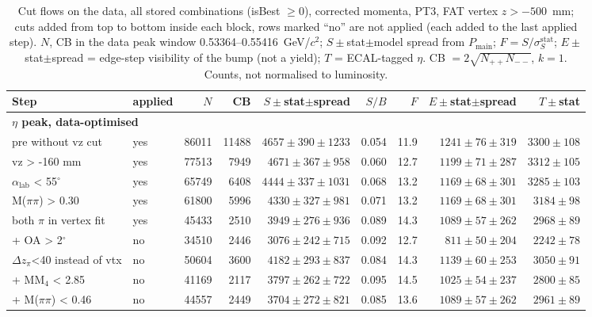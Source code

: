\begin{table}[H]
\centering\footnotesize
\setlength{\tabcolsep}{3pt}
\caption{Cut flows on the data, all stored combinations (isBest $\geq 0$), corrected momenta, PT3, FAT vertex $z>-500$~mm; cuts added from top to bottom inside each block, rows marked ``no'' are not applied (each added to the last applied step). $N$, CB in the data peak window 0.53364--0.55416~GeV/$c^2$; $S\pm$stat$\pm$model spread from $P_\mathrm{main}$; $F=S/\sigma_S^\mathrm{stat}$; $E\pm$stat$\pm$spread = edge-step visibility of the bump (not a yield); $T$ = ECAL-tagged $\eta$. CB $=2\sqrt{N_{++}N_{--}}$, $k=1$. Counts, not normalised to luminosity.}
\label{tab:opt_cutflow}
\begin{tabular}{llrrrrrrr}
\toprule
Step & applied & $N$ & CB & $S\pm$stat$\pm$spread & $S/B$ & $F$ & $E\pm$stat$\pm$spread & $T\pm$stat \\
\midrule
\multicolumn{9}{l}{\textbf{$\eta$ peak, data-optimised}} \\
pre without vz cut & yes & 86011 & 11488 & $4657\pm390\pm1233$ & 0.054 & 11.9 & $1241\pm76\pm319$ & $3300\pm108$ \\
vz > -160 mm & yes & 77513 & 7949 & $4671\pm367\pm958$ & 0.060 & 12.7 & $1199\pm71\pm287$ & $3312\pm105$ \\
$\alpha_\mathrm{lab}$ < 55$^\circ$ & yes & 65749 & 6408 & $4444\pm337\pm1031$ & 0.068 & 13.2 & $1169\pm68\pm301$ & $3285\pm103$ \\
M($\pi\pi$) > 0.30 & yes & 61800 & 5996 & $4330\pm327\pm981$ & 0.071 & 13.2 & $1169\pm68\pm301$ & $3184\pm98$ \\
both $\pi$ in vertex fit & yes & 45433 & 2510 & $3949\pm276\pm936$ & 0.089 & 14.3 & $1089\pm57\pm262$ & $2968\pm89$ \\
+ OA > 2$^\circ$ & no & 34510 & 2446 & $3076\pm242\pm715$ & 0.092 & 12.7 & $811\pm50\pm204$ & $2242\pm78$ \\
$\Delta z_\pi$<40 instead of vtx & no & 50604 & 3600 & $4182\pm293\pm837$ & 0.084 & 14.3 & $1139\pm60\pm253$ & $3050\pm91$ \\
+ MM$_4$ < 2.85 & no & 41169 & 2117 & $3797\pm262\pm722$ & 0.095 & 14.5 & $1025\pm54\pm237$ & $2800\pm85$ \\
+ M($\pi\pi$) < 0.46 & no & 44557 & 2449 & $3704\pm272\pm821$ & 0.085 & 13.6 & $1089\pm57\pm262$ & $2961\pm89$ \\

\end{tabular}
\end{table}
